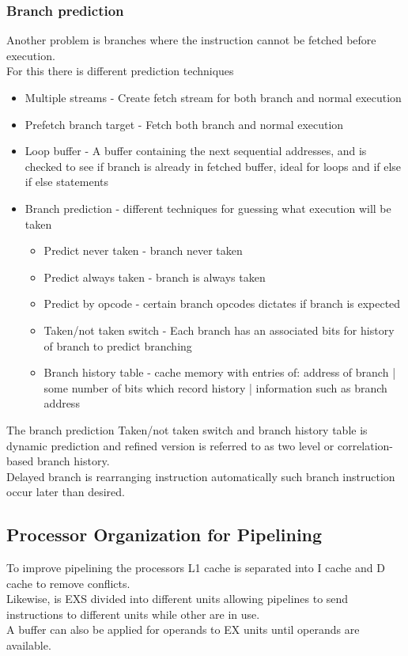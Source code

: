 \documentclass[12pt, a4paper]{article}
\begin{document}
			\subsubsection{Branch prediction}
				Another problem is branches where the instruction cannot be fetched before execution.\\
				For this there is different prediction techniques\\
				\begin{itemize}
					\item Multiple streams - Create fetch stream for both branch and normal execution
					\item Prefetch branch target - Fetch both branch and normal execution
					\item Loop buffer - A buffer containing the next sequential addresses, and is checked to see if branch is already in fetched buffer, ideal for loops and if else if else statements
					\item Branch prediction - different techniques for guessing what execution will be taken
					\begin{itemize}
						\item Predict never taken - branch never taken
						\item Predict always taken - branch is always taken
						\item Predict by opcode - certain branch opcodes dictates if branch is expected
						\item Taken/not taken switch - Each branch has an associated bits for history of branch to predict branching
						\item Branch history table - cache memory with entries of: address of branch | some number of bits which record history | information such as branch address
					\end{itemize}
				\end{itemize}
				The branch prediction Taken/not taken switch and branch history table is dynamic prediction and refined version is referred to as two level or correlation-based branch history.\\
				Delayed branch is rearranging instruction automatically such branch instruction occur later than desired.\\
		\subsection{Processor Organization for Pipelining}
			To improve pipelining the processors L1 cache is separated into I cache and D cache to remove conflicts.\\
			Likewise, is EXS divided into different units allowing pipelines to send instructions to different units while other are in use.\\
			A buffer can also be applied for operands to EX units until operands are available.\\
\end{document}
